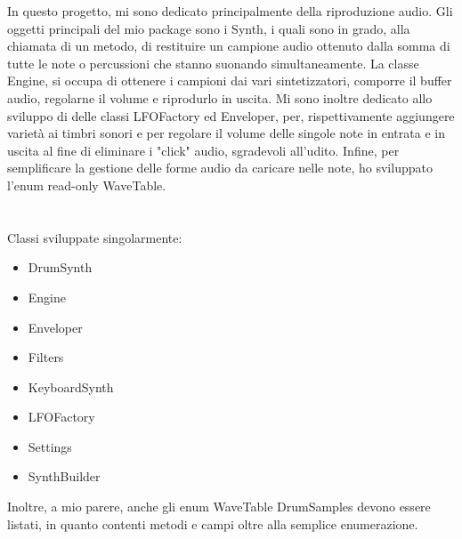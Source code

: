 \documentclass[a4paper,12pt]{report}
\begin{document}
In questo progetto, mi sono dedicato principalmente della riproduzione audio.
Gli oggetti principali del mio package sono i Synth, i quali sono in grado, alla chiamata di un metodo, di restituire un campione audio ottenuto dalla somma di tutte le note o percussioni che stanno suonando simultaneamente.
La classe Engine, si occupa di ottenere i campioni dai vari sintetizzatori, comporre il buffer audio, regolarne il volume e riprodurlo in uscita.
Mi sono inoltre dedicato allo sviluppo di delle classi LFOFactory ed Enveloper, per, rispettivamente aggiungere varietà ai timbri sonori e per regolare il volume delle singole note in entrata e in uscita al fine di eliminare i "click" audio, sgradevoli all'udito.
Infine, per semplificare la gestione delle forme audio da caricare nelle note, ho sviluppato l'enum read-only WaveTable. \\ \\ \\
Classi sviluppate singolarmente:
{
	\begin{itemize}
		\item DrumSynth
		\item Engine
		\item Enveloper
		\item Filters
		\item KeyboardSynth
		\item LFOFactory
		\item Settings
		\item SynthBuilder
	\end{itemize}
} 
\hfill\break
Inoltre, a mio parere, anche gli enum WaveTable DrumSamples devono essere listati, in quanto contenti metodi e campi oltre alla semplice enumerazione.
\newpage
\end{document}
